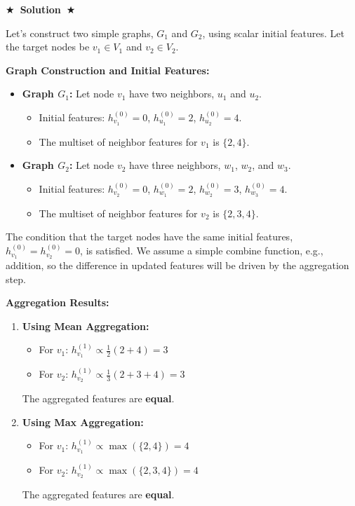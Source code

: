 \documentclass{article}
\numberwithin{figure}{section}
\newcommand{\Solution}[1]{%
	{%
		\medskip
		\color{red}
		\bf $\bigstar$~\sf\textbf{Solution}~$\bigstar$ \sf
		#1
	}
	\bigskip
}
\begin{document}
	\Solution{
		Let's construct two simple graphs, $G_1$ and $G_2$, using scalar initial features. Let the target nodes be $v_1 \in V_1$ and $v_2 \in V_2$.
		
		\textbf{Graph Construction and Initial Features:}
		\begin{itemize}
			\item \textbf{Graph $G_1$:} Let node $v_1$ have two neighbors, $u_1$ and $u_2$.
			\begin{itemize}
				\item Initial features: $h^{(0)}_{v_1} = 0$, $h^{(0)}_{u_1} = 2$, $h^{(0)}_{u_2} = 4$.
				\item The multiset of neighbor features for $v_1$ is $\{2, 4\}$.
			\end{itemize}
			\item \textbf{Graph $G_2$:} Let node $v_2$ have three neighbors, $w_1$, $w_2$, and $w_3$.
			\begin{itemize}
				\item Initial features: $h^{(0)}_{v_2} = 0$, $h^{(0)}_{w_1} = 2$, $h^{(0)}_{w_2} = 3$, $h^{(0)}_{w_3} = 4$.
				\item The multiset of neighbor features for $v_2$ is $\{2, 3, 4\}$.
			\end{itemize}
		\end{itemize}
		The condition that the target nodes have the same initial features, $h^{(0)}_{v_1} = h^{(0)}_{v_2} = 0$, is satisfied. We assume a simple combine function, e.g., addition, so the difference in updated features will be driven by the aggregation step.
		
		\textbf{Aggregation Results:}
		
		\begin{enumerate}
			\item \textbf{Using Mean Aggregation:}
			\begin{itemize}
				\item For $v_1$: $h^{(1)}_{v_1} \propto \frac{1}{2}(2+4) = 3$
				\item For $v_2$: $h^{(1)}_{v_2} \propto \frac{1}{3}(2+3+4) = 3$
			\end{itemize}
			The aggregated features are \textbf{equal}.
			
			\item \textbf{Using Max Aggregation:}
			\begin{itemize}
				\item For $v_1$: $h^{(1)}_{v_1} \propto \max(\{2, 4\}) = 4$
				\item For $v_2$: $h^{(1)}_{v_2} \propto \max(\{2, 3, 4\}) = 4$
			\end{itemize}
			The aggregated features are \textbf{equal}.
			

\end{enumerate}}
\end{document}
